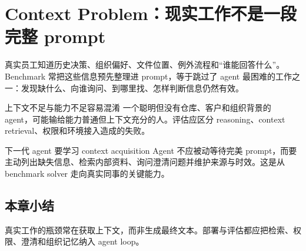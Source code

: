 \section{Context Problem：现实工作不是一段完整 prompt}



真实员工知道历史决策、组织偏好、文件位置、例外流程和“谁能回答什么”。Benchmark 常把这些信息预先整理进 prompt，等于跳过了 agent 最困难的工作之一：发现缺什么、向谁询问、到哪里找、怎样判断信息仍然有效。

\begin{warningbox}{上下文不足与能力不足容易混淆}
一个聪明但没有仓库、客户和组织背景的 agent，可能输给能力普通但上下文充分的人。评估应区分 reasoning、context retrieval、权限和环境接入造成的失败。
\end{warningbox}

\begin{importantbox}{下一代 agent 要学习 context acquisition}
Agent 不应被动等待完美 prompt，而要主动列出缺失信息、检索内部资料、询问澄清问题并维护来源与时效。这是从 benchmark solver 走向真实同事的关键能力。
\end{importantbox}


\subsection{本章小结}

真实工作的瓶颈常在获取上下文，而非生成最终文本。部署与评估都应把检索、权限、澄清和组织记忆纳入 agent loop。

